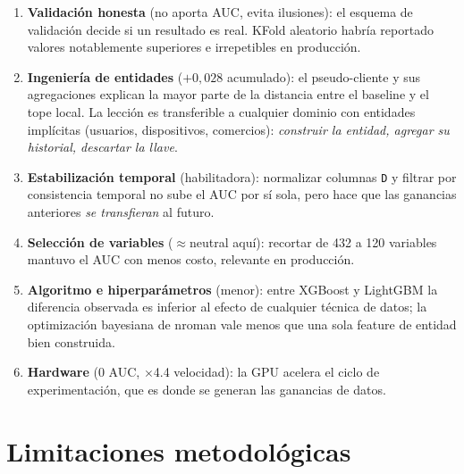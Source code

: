 \begin{enumerate}
  \item \textbf{Validación honesta} (no aporta AUC, evita ilusiones): el esquema de validación
        decide si un resultado es real. KFold aleatorio habría reportado valores notablemente
        superiores e irrepetibles en producción.
  \item \textbf{Ingeniería de entidades} ($+0{,}028$ acumulado): el pseudo-cliente y sus
        agregaciones explican la mayor parte de la distancia entre el baseline y el tope local.
        La lección es transferible a cualquier dominio con entidades implícitas (usuarios,
        dispositivos, comercios): \emph{construir la entidad, agregar su historial, descartar la
        llave}.
  \item \textbf{Estabilización temporal} (habilitadora): normalizar columnas \texttt{D} y filtrar
        por consistencia temporal no sube el AUC por sí sola, pero hace que las ganancias
        anteriores \emph{se transfieran} al futuro.
  \item \textbf{Selección de variables} ($\approx$neutral aquí): recortar de 432 a 120 variables
        mantuvo el AUC con menos costo, relevante en producción.
  \item \textbf{Algoritmo e hiperparámetros} (menor): entre XGBoost y LightGBM la diferencia
        observada es inferior al efecto de cualquier técnica de datos; la optimización bayesiana
        de nroman vale menos que una sola feature de entidad bien construida.
  \item \textbf{Hardware} ($0$ AUC, $\times$4.4 velocidad): la GPU acelera el ciclo de
        experimentación, que es donde se generan las ganancias de datos.
\end{enumerate}

\section{Limitaciones metodológicas}
\label{sec:limites}

